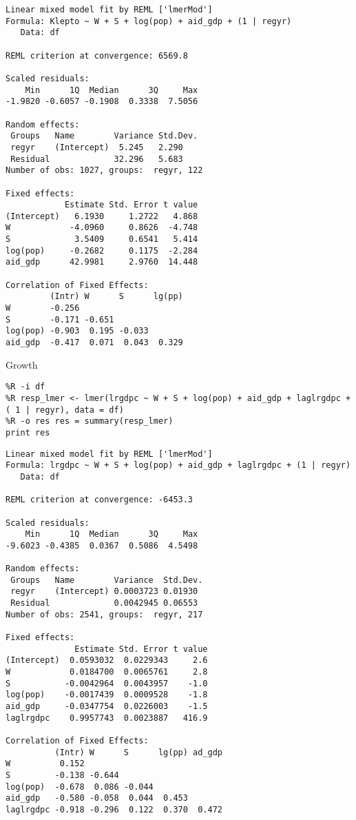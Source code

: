 \documentclass[12pt,fleqn]{article}\usepackage{common}
\begin{document}
\begin{verbatim}
Linear mixed model fit by REML ['lmerMod']
Formula: Klepto ~ W + S + log(pop) + aid_gdp + (1 | regyr)
   Data: df

REML criterion at convergence: 6569.8

Scaled residuals: 
    Min      1Q  Median      3Q     Max 
-1.9820 -0.6057 -0.1908  0.3338  7.5056 

Random effects:
 Groups   Name        Variance Std.Dev.
 regyr    (Intercept)  5.245   2.290   
 Residual             32.296   5.683   
Number of obs: 1027, groups:  regyr, 122

Fixed effects:
            Estimate Std. Error t value
(Intercept)   6.1930     1.2722   4.868
W            -4.0960     0.8626  -4.748
S             3.5409     0.6541   5.414
log(pop)     -0.2682     0.1175  -2.284
aid_gdp      42.9981     2.9760  14.448

Correlation of Fixed Effects:
         (Intr) W      S      lg(pp)
W        -0.256                     
S        -0.171 -0.651              
log(pop) -0.903  0.195 -0.033       
aid_gdp  -0.417  0.071  0.043  0.329

\end{verbatim}



Growth


\begin{verbatim}
%R -i df
%R resp_lmer <- lmer(lrgdpc ~ W + S + log(pop) + aid_gdp + laglrgdpc + ( 1 | regyr), data = df)
%R -o res res = summary(resp_lmer)
print res
\end{verbatim}

\begin{verbatim}
Linear mixed model fit by REML ['lmerMod']
Formula: lrgdpc ~ W + S + log(pop) + aid_gdp + laglrgdpc + (1 | regyr)
   Data: df

REML criterion at convergence: -6453.3

Scaled residuals: 
    Min      1Q  Median      3Q     Max 
-9.6023 -0.4385  0.0367  0.5086  4.5498 

Random effects:
 Groups   Name        Variance  Std.Dev.
 regyr    (Intercept) 0.0003723 0.01930 
 Residual             0.0042945 0.06553 
Number of obs: 2541, groups:  regyr, 217

Fixed effects:
              Estimate Std. Error t value
(Intercept)  0.0593032  0.0229343     2.6
W            0.0184700  0.0065761     2.8
S           -0.0042964  0.0043957    -1.0
log(pop)    -0.0017439  0.0009528    -1.8
aid_gdp     -0.0347754  0.0226003    -1.5
laglrgdpc    0.9957743  0.0023887   416.9

Correlation of Fixed Effects:
          (Intr) W      S      lg(pp) ad_gdp
W          0.152                            
S         -0.138 -0.644                     
log(pop)  -0.678  0.086 -0.044              
aid_gdp   -0.580 -0.058  0.044  0.453       
laglrgdpc -0.918 -0.296  0.122  0.370  0.472

\end{verbatim}
\end{document}
